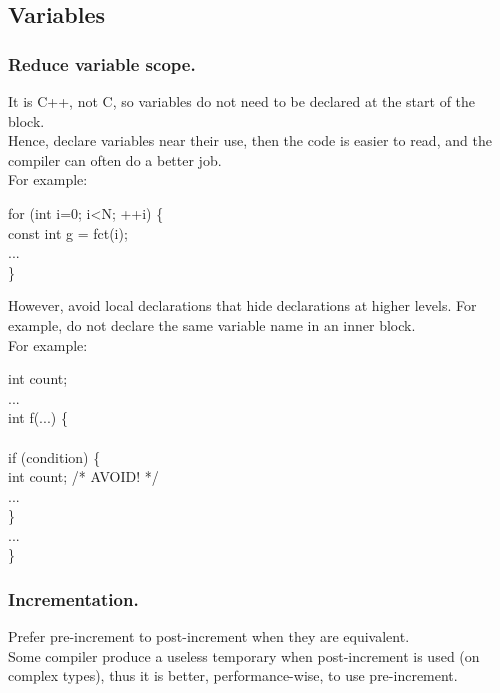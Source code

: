 \subsection{Variables}
\subsubsection{Reduce variable scope.}
It is C++, not C, so variables do not need to be declared at the start
of the block.\\
Hence, declare variables near their use, then the code is easier to
read, and the compiler can often do a better job.\\

For example:
\begin{algorithm}[H]
for (int i=0; i<N; ++i) \{ \\
const int g = fct(i); \\
... \\
\}
\end{algorithm}

However, avoid local declarations that hide declarations at higher
levels. For example, do not declare the same variable name in an inner
block.\\

For example:
\begin{algorithm}[H]
int count; \\
... \\
int f(...) \{ \\
 \\
if (condition) \{ \\
int count; /* AVOID! */ \\
... \\
\} \\
... \\
\}
\end{algorithm}

\subsubsection{Incrementation.}
Prefer pre-increment to post-increment when they are equivalent.\\
Some compiler produce a useless temporary when post-increment is used
(on complex types), thus it is better, performance-wise, to use
pre-increment.\\

